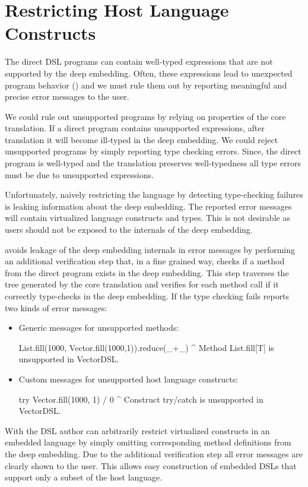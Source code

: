 \section{Restricting Host Language Constructs}
\label{sec:restricting}

The direct DSL programs can contain well-typed expressions that are not
supported by the deep embedding. Often, these expressions lead to unexpected program
behavior () and we must rule them out by reporting meaningful and
precise error messages to the user.

We could rule out unsupported programs by relying on properties of the
core translation. If a direct program contains unsupported expressions, after
translation it will become ill-typed in the deep embedding. We could reject
unsupported programs by simply reporting type checking errors. Since, the
direct program is well-typed and the translation preserves well-typedness all
type errors must be due to unsupported expressions.

Unfortunately, naively restricting the language by detecting type-checking
failures is leaking information about the deep embedding. The reported error
messages will contain virtualized language constructs and types. This is not desirable
as users should not be exposed to the internals of the deep embedding.

\tool avoids leakage of the deep embedding internals in error messages by performing an
additional verification step that, in a fine grained way, checks if a method
from the direct program exists in the deep embedding. This step traverses the
tree generated by the core translation and verifies for each method call if it
correctly type-checks in the deep embedding. If the type checking fails \tool
reports two kinds of error messages:

\begin{itemize}
\item Generic messages for unsupported methods:
\begin{lstparagraph}
List.fill(1000, Vector.fill(1000,1)).reduce(_+_)
^
Method List.fill[T] is unsupported in VectorDSL.
\end{lstparagraph}

\item Custom messages for unsupported host language constructs:\begin{lstparagraph}
try Vector.fill(1000, 1) / 0
^
Construct try/catch is unsupported in VectorDSL.
\end{lstparagraph}
\end{itemize}
%
With \tool the DSL author can arbitrarily restrict virtualized constructs in an
embedded language by simply omitting corresponding method definitions from the
deep embedding. Due to the additional verification step all error messages are
clearly shown to the user. This allows easy construction of embedded DSLs that
support only a subset of the host language.


